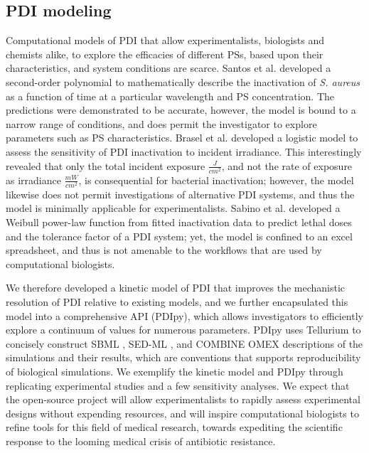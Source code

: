 \subsection*{PDI modeling}
Computational models of PDI that allow experimentalists, biologists and chemists alike, to explore the efficacies of different PSs, based upon their characteristics, and system conditions are scarce. Santos et al. \cite{Santos2020ApplicationAureus} developed a second-order polynomial to mathematically describe the inactivation of \textit{S. aureus} as a function of time at a particular wavelength and PS concentration. The predictions were demonstrated to be accurate, however, the model is bound to a narrow range of conditions, and does permit the investigator to explore parameters such as PS characteristics. Brasel et al. \cite{Brasel2020AnAgalactiae} developed a logistic model to assess the sensitivity of PDI inactivation to incident irradiance. This interestingly revealed that only the total incident exposure $\frac{J}{cm^2}$, and not the rate of exposure as irradiance $\frac{mW}{cm^2}$, is consequential for bacterial inactivation; however, the model likewise does not permit investigations of alternative PDI systems, and thus the model is minimally applicable for experimentalists. Sabino et al. \cite{Sabino2019InactivationTherapy} developed a Weibull power-law function from fitted inactivation data to predict lethal doses and the tolerance factor of a PDI system; yet, the model is confined to an excel spreadsheet, and thus is not amenable to the workflows that are used by computational biologists. 

We therefore developed a kinetic model of PDI that improves the mechanistic resolution of PDI relative to existing models, and we further encapsulated this model into a comprehensive API (PDIpy), which allows investigators to efficiently explore a continuum of values for numerous parameters. PDIpy uses Tellurium \cite{Choi2018Tellurium:Biology} to concisely construct SBML \cite{Keating2020Models}, SED-ML \cite{Waltemath2011ReproducibleLanguage}, and COMBINE OMEX \cite{Bergmann2014COMBINEProject} descriptions of the simulations and their results, which are conventions that supports reproducibility of biological simulations. We exemplify the kinetic model and PDIpy through replicating experimental studies and a few sensitivity analyses. We expect that the open-source project will allow experimentalists to rapidly assess experimental designs without expending resources, and will inspire computational biologists to refine tools for this field of medical research, towards expediting the scientific response to the looming medical crisis of antibiotic resistance. 

